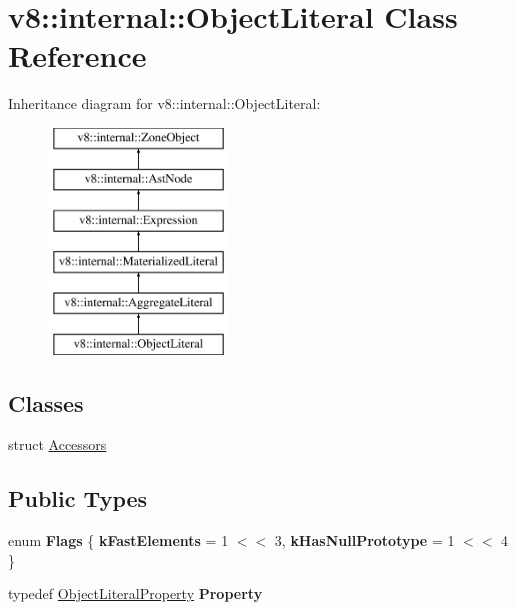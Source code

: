 \hypertarget{classv8_1_1internal_1_1ObjectLiteral}{}\section{v8\+:\+:internal\+:\+:Object\+Literal Class Reference}
\label{classv8_1_1internal_1_1ObjectLiteral}
Inheritance diagram for v8\+:\+:internal\+:\+:Object\+Literal\+:\begin{figure}[H]
\begin{center}
\leavevmode
\includegraphics[height=6.000000cm]{classv8_1_1internal_1_1ObjectLiteral}
\end{center}
\end{figure}
\subsection*{Classes}
\begin{DoxyCompactItemize}
\item 
struct \mbox{\hyperlink{structv8_1_1internal_1_1ObjectLiteral_1_1Accessors}{Accessors}}
\end{DoxyCompactItemize}
\subsection*{Public Types}
\begin{DoxyCompactItemize}
\item 
\mbox{\label{classv8_1_1internal_1_1ObjectLiteral_a2d3487eb42d6a0174042c3656f6500b3}} 
enum {\bfseries Flags} \{ {\bfseries k\+Fast\+Elements} = 1 $<$$<$ 3, 
{\bfseries k\+Has\+Null\+Prototype} = 1 $<$$<$ 4
 \}
\item 
\mbox{\label{classv8_1_1internal_1_1ObjectLiteral_a0c439cc7369713975ac1ea37bf7b0502}} 
typedef \mbox{\hyperlink{classv8_1_1internal_1_1ObjectLiteralProperty}{Object\+Literal\+Property}} {\bfseries Property}
\end{DoxyCompactItemize}
